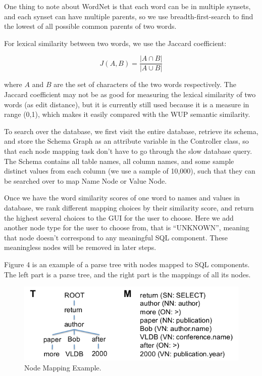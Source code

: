 \documentclass[twocolumn]{article}
\begin{document}
One thing to note about WordNet is that each word can be in multiple synsets, and each synset can have multiple parents, so we use breadth-first-search to find the lowest of all possible common parents of two words.

For lexical similarity between two words, we use the Jaccard coefficient:

$$ J(A, B) = \frac{|A \cap B|}{|A \cup B|}$$

where $A$ and $B$ are the set of characters of the two words respectively. The Jaccard coefficient may not be as good for measuring the lexical similarity of two words (as edit distance), but it is currently still used because it is a measure in range (0,1), which makes it easily compared with the WUP semantic similarity.

To search over the database, we first visit the entire database, retrieve its schema, and store the Schema Graph as an attribute variable in the Controller class, so that each node mapping task don’t have to go through the slow database query. The Schema contains all table names, all column names, and some sample distinct values from each column (we use a sample of 10,000), such that they can be searched over to map Name Node or Value Node.

Once we have the word similarity scores of one word to names and values in database, we rank different mapping choices by their similarity score, and return the highest several choices to the GUI for the user to choose. Here we add another node type for the user to choose from, that is “UNKNOWN”, meaning that node doesn’t correspond to any meaningful SQL component. These meaningless nodes will be removed in later steps.

Figure 4 is an example of a parse tree with nodes mapped to SQL components. The left part is a parse tree, and the right part is the mappings of all its nodes.

\begin{figure}[ht]
  \centering
  \includegraphics[width=0.9\linewidth]{figures/nodes_mapping_example.png}
  \caption[caption for nodes mapping example]{Node Mapping Example.\protect\footnotemark }
\end{figure}
\end{document}
